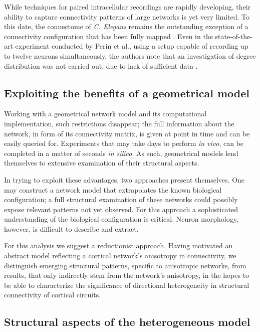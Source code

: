While techniques for paired intracellular recordings are rapidly
developing, their ability to capture connectivity patterns of large
networks is yet very limited. To this date, the connectome of
\textit{C. Elegans} remains the outstanding exception of a
connectivity configuration that has been fully mapped
\parencite{White1986}. Even in the state-of-the-art experiment
conducted by Perin et al., using a setup capable of recording up to
twelve neurons simultaneously, the authors note that an investigation
of degree distribution was not carried out, due to lack of sufficient
data
\parencite{Perin2011}.

\subsection*{Exploiting the benefits of a geometrical model}

Working with a geometrical network model and its computational
implementation, such restrictions disappear; the full information
about the network, in form of its connectivity matrix, is given at
point in time and can be easily queried for. Experiments that may take
days to perform \textit{in vivo}, can be completed in a matter of
seconds \textit{in silico}. As such, geometrical models lend
themselves to extensive examination of their structural aspects.

In trying to exploit these advantages, two approaches present
themselves. One may construct a network model that
extrapolates the known
biological configuration; a full structural examination of these
networks could possibly expose relevant patterns not yet observed. For
this approach a sophisticated understanding of the biological
configuration is critical. Neuron morphology, however, is difficult to
describe and extract.

For this analysis we suggest a reductionist approach. Having motivated
an abstract model reflecting a cortical network's anisotropy in
connectivity, we distinguish emerging structural patterns, specific to
anisotropic networks, from results, that only indirectly stem from the
network's anisotropy, in the hopes to be able to characterize the
significance of directional heterogeneity in structural connectivity
of cortical circuits.


\subsection*{Structural aspects of the heterogeneous model}

